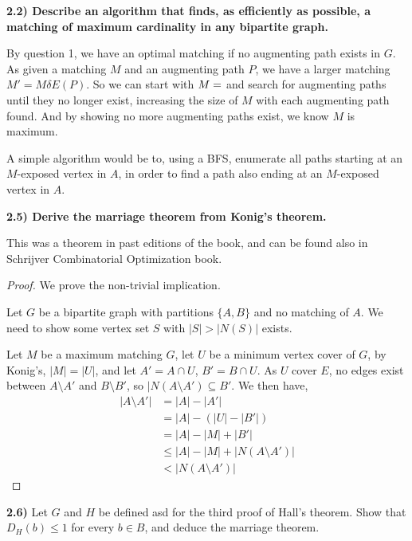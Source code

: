 \documentclass[11pt]{article}
\theoremstyle{plain}
\begin{document}
\textbf{2.2) Describe an algorithm that finds, as efficiently as possible, a matching of maximum cardinality in any bipartite graph.}

By question 1, we have an optimal matching if no augmenting path exists in $G$.
As given a matching $M$ and an augmenting path $P$, we have a larger matching $M'=M \delta E(P)$. So we can start with $M=\empty$ and search for augmenting paths until they no longer exist, increasing the size of $M$ with each augmenting path found.
And by showing no more augmenting paths exist, we know $M$ is maximum.

A simple algorithm would be to, using a BFS, enumerate all paths starting at an $M$-exposed vertex in $A$, in order to find a path also ending at an $M$-exposed vertex in $A$. 

\textbf{2.5) Derive the marriage theorem from Konig's theorem.}

This was a theorem in past editions of the book, and can be found also in Schrijver Combinatorial Optimization book.

\begin{proof}
We prove the non-trivial implication.

Let $G$ be a bipartite graph with partitions $\{A,B\}$ and no matching of $A$. We need to show some vertex set $S$ with $|S|>|N(S)|$ exists. 

Let $M$ be a maximum matching $G$, let $U$ be a minimum vertex cover of $G$, by Konig's, $|M| = |U|$, and let $A' = A \cap U$, $B' = B \cap U$. As $U$ cover $E$, no edges exist between $A\setminus A'$ and $B\setminus B'$, so $|N(A \setminus A') \subseteq B'$. We then have,
\begin{align*}
|A\setminus A'| & = |A| - |A'| \\
& = |A| - (|U| - |B'|) \\
& = |A| - |M| + |B'| \\
& \leq |A| - |M| + |N(A \setminus A')| \\
& < |N(A \setminus A')|
\end{align*}
\end{proof}

\textbf{2.6)} Let $G$ and $H$ be defined asd for the third proof of Hall's theorem. Show that $D_H(b) \leq 1$ for every $b \in B$, and deduce the marriage theorem.
\end{document}
